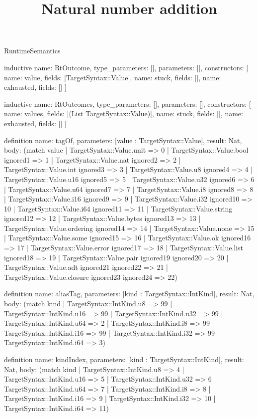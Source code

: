 \begin{lexlean}{RuntimeSemantics}
\title{Natural number addition}
\begin{semanticmodule}
inductive{
  name: RtOutcome,
  type_parameters: [],
  parameters: [],
  constructors: [
    {name: value, fields: [TargetSyntax::Value]},
    {name: stuck, fields: []},
    {name: exhausted, fields: []}
  ]
}

inductive{
  name: RtOutcomes,
  type_parameters: [],
  parameters: [],
  constructors: [
    {name: values, fields: [(List TargetSyntax::Value)]},
    {name: stuck, fields: []},
    {name: exhausted, fields: []}
  ]
}

definition{
  name: tagOf,
  parameters: [value : TargetSyntax::Value],
  result: Nat,
  body: (match value
    | TargetSyntax::Value.unit => 0
    | TargetSyntax::Value.bool ignored1 => 1
    | TargetSyntax::Value.nat ignored2 => 2
    | TargetSyntax::Value.int ignored3 => 3
    | TargetSyntax::Value.u8 ignored4 => 4
    | TargetSyntax::Value.u16 ignored5 => 5
    | TargetSyntax::Value.u32 ignored6 => 6
    | TargetSyntax::Value.u64 ignored7 => 7
    | TargetSyntax::Value.i8 ignored8 => 8
    | TargetSyntax::Value.i16 ignored9 => 9
    | TargetSyntax::Value.i32 ignored10 => 10
    | TargetSyntax::Value.i64 ignored11 => 11
    | TargetSyntax::Value.string ignored12 => 12
    | TargetSyntax::Value.bytes ignored13 => 13
    | TargetSyntax::Value.ordering ignored14 => 14
    | TargetSyntax::Value.none => 15
    | TargetSyntax::Value.some ignored15 => 16
    | TargetSyntax::Value.ok ignored16 => 17
    | TargetSyntax::Value.error ignored17 => 18
    | TargetSyntax::Value.list ignored18 => 19
    | TargetSyntax::Value.pair ignored19 ignored20 => 20
    | TargetSyntax::Value.adt ignored21 ignored22 => 21
    | TargetSyntax::Value.closure ignored23 ignored24 => 22)
}

definition{
  name: aliasTag,
  parameters: [kind : TargetSyntax::IntKind],
  result: Nat,
  body: (match kind
    | TargetSyntax::IntKind.u8 => 99
    | TargetSyntax::IntKind.u16 => 99
    | TargetSyntax::IntKind.u32 => 99
    | TargetSyntax::IntKind.u64 => 2
    | TargetSyntax::IntKind.i8 => 99
    | TargetSyntax::IntKind.i16 => 99
    | TargetSyntax::IntKind.i32 => 99
    | TargetSyntax::IntKind.i64 => 3)
}

definition{
  name: kindIndex,
  parameters: [kind : TargetSyntax::IntKind],
  result: Nat,
  body: (match kind
    | TargetSyntax::IntKind.u8 => 4
    | TargetSyntax::IntKind.u16 => 5
    | TargetSyntax::IntKind.u32 => 6
    | TargetSyntax::IntKind.u64 => 7
    | TargetSyntax::IntKind.i8 => 8
    | TargetSyntax::IntKind.i16 => 9
    | TargetSyntax::IntKind.i32 => 10
    | TargetSyntax::IntKind.i64 => 11)
}


\end{semanticmodule}
\end{lexlean}
